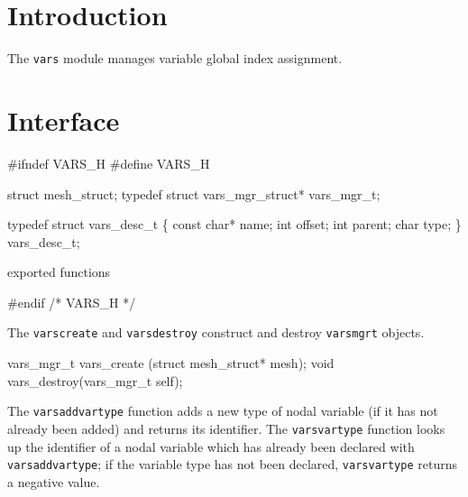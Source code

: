 
\section{Introduction}

The {\tt{}vars} module manages variable global index assignment.


\section{Interface}

\endmoddef
#ifndef VARS_H
#define VARS_H

struct mesh_struct;
typedef struct vars_mgr_struct* vars_mgr_t;

typedef struct vars_desc_t \{
    const char*  name;
    int          offset;
    int          parent;
    char         type;
\} vars_desc_t;

\LA{}exported functions~{\nwtagstyle{}}\RA{}

#endif /* VARS_H */
\nwendcode{}\nwdocspar

The {\tt{}vars{}create} and {\tt{}vars{}destroy} construct and destroy
{\tt{}vars{}mgr{}t} objects.

\nwenddocs{}\endmoddef
vars_mgr_t vars_create (struct mesh_struct* mesh);
void       vars_destroy(vars_mgr_t self);

\nwendcode{}\nwdocspar

The {\tt{}vars{}add{}vartype} function adds a new type of nodal variable
(if it has not already been added) and returns its identifier.
The {\tt{}vars{}vartype} function looks up the identifier of a nodal
variable which has already been declared with {\tt{}vars{}add{}vartype};
if the variable type has not been declared, {\tt{}vars{}vartype} returns
a negative value.

